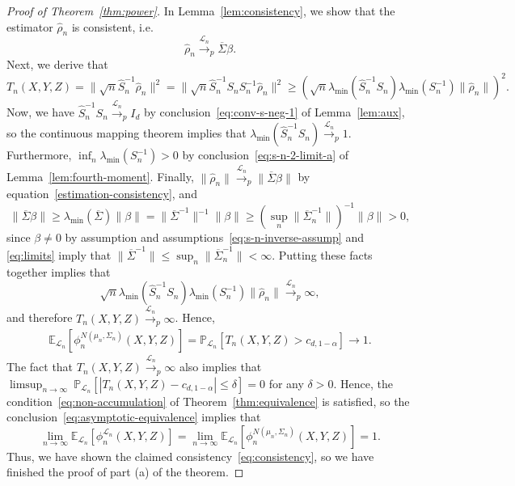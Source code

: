 \documentclass[ejs]{imsart}
\numberwithin{equation}{section}
\theoremstyle{plain}
\theoremstyle{definition}
\theoremstyle{remark}
\newcommand{\srx}{X}
\newcommand{\srz}{Z}
\newcommand{\sry}{Y}
\begin{document}
\begin{proof}[Proof of Theorem~\ref{thm:power}]
	
In Lemma~\ref{lem:consistency}, we show that the estimator $\widehat \rho_n$ is consistent, i.e. 
\begin{equation}
\widehat \rho_n \overset{\mathcal L_n}\rightarrow_p \overline\Sigma \beta. 
\label{estimation-consistency}
\end{equation}
Next, we derive that
\begin{equation*}
T_n(\srx, \sry, \srz) = \|\sqrt n\widehat S_n^{-1}\widehat \rho_n\|^2 = \|\sqrt n\widehat S_n^{-1}S_n S_n^{-1}\widehat \rho_n\|^2 \geq \left(\sqrt{n}\lambda_{\min}(\widehat S_n^{-1}S_n)\lambda_{\min}(S_n^{-1}) \|\widehat \rho_n\|\right)^2.
\end{equation*}
Now, we have $\widehat S_n^{-1}S_n \overset{\mathcal L_n}\rightarrow _p  I_d$ by conclusion~\eqref{eq:conv-s-neg-1} of Lemma~\ref{lem:aux}, so the continuous mapping theorem implies that $\lambda_{\min}(\widehat S_n^{-1}S_n) \overset{\mathcal L_n}\rightarrow _p 1$. Furthermore, $\inf_n \lambda_{\min}(S_n^{-1}) > 0$ by conclusion~\eqref{eq:s-n-2-limit-a} of Lemma~\ref{lem:fourth-moment}. Finally, $\|\widehat \rho_n\| \overset{\mathcal L_n}\rightarrow _p \|\overline \Sigma \beta\|$ by equation~\eqref{estimation-consistency}, and 
\[
\|\overline \Sigma \beta\| \geq \lambda_{\min}(\overline \Sigma)\|\beta\| = \|\overline \Sigma^{-1}\|^{-1}\|\beta\| \geq \left(\sup_n \|\overline \Sigma_n^{-1}\|\right)^{-1}\|\beta\| > 0,
\]
since $\beta \neq 0$ by assumption and assumptions~\eqref{eq:s-n-inverse-assump} and \eqref{eq:limits} imply that $\|\overline \Sigma^{-1}\| \leq \sup_n \|\overline \Sigma_n^{-1}\| < \infty$. Putting these facts together implies that 
\begin{equation*}
\sqrt{n}\lambda_{\min}(\widehat S_n^{-1}S_n)\lambda_{\min}(S_n^{-1}) \|\widehat \rho_n\|\overset{\mathcal L_n}\rightarrow _p \infty, 
\end{equation*}
and therefore $T_n(\srx, \sry, \srz) \overset{\mathcal L_n}\rightarrow _p \infty$. Hence,
\begin{equation}
\begin{split}
\mathbb E_{\mathcal L_n}[\phi_n^{N(\mu_n, \Sigma_n)}(\srx, \sry, \srz)] = \mathbb P_{\mathcal L_n}[T_n(\srx, \sry, \srz) > c_{d,1-\alpha}] \rightarrow 1.
\end{split}
\end{equation}
The fact that $T_n(\srx, \sry, \srz) \overset{\mathcal L_n}\rightarrow _p \infty$ also implies that $\limsup_{n \rightarrow \infty}\ \mathbb P_{\mathcal L_n}[|T_n(\srx, \sry, \srz)-c_{d,1-\alpha}| \leq \delta] = 0$ for any $\delta > 0$. Hence, the condition~\eqref{eq:non-accumulation} of Theorem~\ref{thm:equivalence} is satisfied, so the conclusion~\eqref{eq:asymptotic-equivalence} implies that
\begin{equation*}
\lim_{n \rightarrow \infty}\mathbb E_{\mathcal L_n}[\phi_n^{\mathcal L_n}(\srx, \sry, \srz)] = \lim_{n \rightarrow \infty}\mathbb E_{\mathcal L_n}[\phi_n^{N(\mu_n, \Sigma_n)}(\srx, \sry, \srz)] = 1.
\end{equation*} 
Thus, we have shown the claimed consistency~\eqref{eq:consistency}, so we have finished the proof of part (a) of the theorem.
	

\end{proof}
\end{document}
